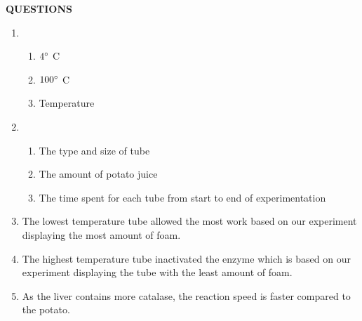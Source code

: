 \documentclass{article}
\begin{document}
\textbf{QUESTIONS}
\begin{enumerate}[label=\arabic*.]
    \item
        \begin{enumerate}[label=\alph*)]
            \item $ 4\degree $ C
            \item $ 100\degree $ C
            \item Temperature
        \end{enumerate}
    \item
        \begin{enumerate}[label=\arabic*)]
            \item The type and size of tube
            \item The amount of potato juice
            \item The time spent for each tube from start to end of experimentation
        \end{enumerate}
    \item The lowest temperature tube allowed the most work based on our experiment displaying the most amount of foam.
    \item The highest temperature tube inactivated the enzyme which is based on our experiment displaying the tube with the least amount of foam.
    \item As the liver contains more catalase, the reaction speed is faster compared to the potato.
\end{enumerate}
\end{document}
